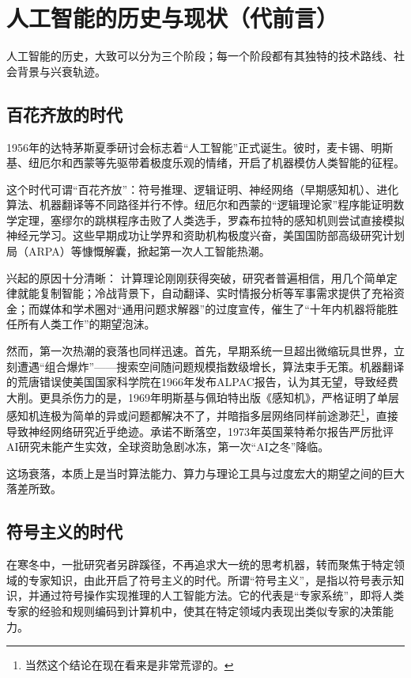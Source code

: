 \chapter{人工智能的历史与现状（代前言）}

人工智能的历史，大致可以分为三个阶段；每一个阶段都有其独特的技术路线、社会背景与兴衰轨迹。

\section{百花齐放的时代}

1956年的达特茅斯夏季研讨会标志着“人工智能”正式诞生。彼时，麦卡锡、明斯基、纽厄尔和西蒙等先驱带着极度乐观的情绪，开启了机器模仿人类智能的征程。

这个时代可谓“百花齐放”：符号推理、逻辑证明、神经网络（早期感知机）、进化算法、机器翻译等不同路径并行不悖。纽厄尔和西蒙的“逻辑理论家”程序能证明数学定理，塞缪尔的跳棋程序击败了人类选手，罗森布拉特的感知机则尝试直接模拟神经元学习。这些早期成功让学界和资助机构极度兴奋，美国国防部高级研究计划局（ARPA）等慷慨解囊，掀起第一次人工智能热潮。

兴起的原因十分清晰： 计算理论刚刚获得突破，研究者普遍相信，用几个简单定律就能复制智能；冷战背景下，自动翻译、实时情报分析等军事需求提供了充裕资金；而媒体和学术圈对“通用问题求解器”的过度宣传，催生了“十年内机器将能胜任所有人类工作”的期望泡沫。

然而，第一次热潮的衰落也同样迅速。首先，早期系统一旦超出微缩玩具世界，立刻遭遇“组合爆炸”——搜索空间随问题规模指数级增长，算法束手无策。机器翻译的荒唐错误使美国国家科学院在1966年发布ALPAC报告，认为其无望，导致经费大削。更具杀伤力的是，1969年明斯基与佩珀特出版《感知机》，严格证明了单层感知机连极为简单的异或问题都解决不了，并暗指多层网络同样前途渺茫\footnote{当然这个结论在现在看来是非常荒谬的。}，直接导致神经网络研究近乎绝迹。承诺不断落空，1973年英国莱特希尔报告严厉批评AI研究未能产生实效，全球资助急剧冰冻，第一次“AI之冬”降临。

这场衰落，本质上是当时算法能力、算力与理论工具与过度宏大的期望之间的巨大落差所致。

\section{符号主义的时代}

在寒冬中，一批研究者另辟蹊径，不再追求大一统的思考机器，转而聚焦于特定领域的专家知识，由此开启了符号主义的时代。所谓“符号主义”，是指以符号表示知识，并通过符号操作实现推理的人工智能方法。它的代表是“专家系统”，即将人类专家的经验和规则编码到计算机中，使其在特定领域内表现出类似专家的决策能力。

